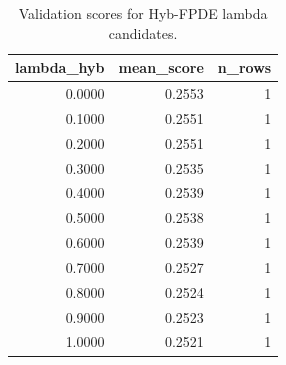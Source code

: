 \begin{table}[t]
\caption{Validation scores for Hyb-FPDE lambda candidates.}
\label{tab:lambda_distribution_computed}
\centering
\begin{tabular}{rrr}
\toprule
lambda\_hyb & mean\_score & n\_rows \\
\midrule
0.0000 & 0.2553 & 1 \\
0.1000 & 0.2551 & 1 \\
0.2000 & 0.2551 & 1 \\
0.3000 & 0.2535 & 1 \\
0.4000 & 0.2539 & 1 \\
0.5000 & 0.2538 & 1 \\
0.6000 & 0.2539 & 1 \\
0.7000 & 0.2527 & 1 \\
0.8000 & 0.2524 & 1 \\
0.9000 & 0.2523 & 1 \\
1.0000 & 0.2521 & 1 \\
\bottomrule
\end{tabular}

\end{table}
